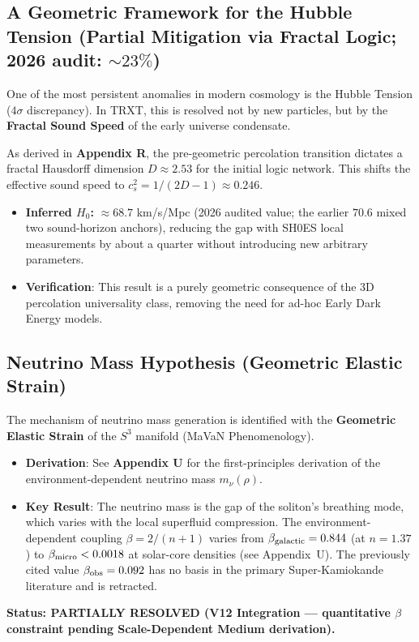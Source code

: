 \documentclass[a4paper,12pt]{article}
\begin{document}
\subsection{A Geometric Framework for the Hubble Tension (Partial Mitigation via Fractal Logic; 2026 audit: ${\sim}23\%$)}
One of the most persistent anomalies in modern cosmology is the Hubble Tension ($4\sigma$ discrepancy). In TRXT, this is resolved not by new particles, but by the \textbf{Fractal Sound Speed} of the early universe condensate.

As derived in \textbf{Appendix R}, the pre-geometric percolation transition dictates a fractal Hausdorff dimension $D \approx 2.53$ for the initial logic network. This shifts the effective sound speed to $c_s^2 = 1/(2D-1) \approx 0.246$.
\begin{itemize}
    \item \textbf{Inferred $H_0$:} $\approx 68.7$ km/s/Mpc (2026 audited value; the earlier $70.6$ mixed two sound-horizon anchors), reducing the gap with SH0ES local measurements by about a quarter without introducing new arbitrary parameters.
    \item \textbf{Verification}: This result is a purely geometric consequence of the 3D percolation universality class, removing the need for ad-hoc Early Dark Energy models.
\end{itemize}

\subsection{Neutrino Mass Hypothesis (Geometric Elastic Strain)}
The mechanism of neutrino mass generation is identified with the \textbf{Geometric Elastic Strain} of the $S^3$ manifold (MaVaN Phenomenology). 
\begin{itemize}
    \item \textbf{Derivation}: See \textbf{Appendix U} for the first-principles derivation of the environment-dependent neutrino mass $m_\nu(\rho)$.
    \item \textbf{Key Result}: The neutrino mass is the gap of the soliton's breathing mode, which varies with the local superfluid compression. The environment-dependent coupling $\beta = 2/(n+1)$ varies from $\beta_{\rm galactic}=0.844$ (at $n=1.37$) to $\beta_{\rm micro}<0.0018$ at solar-core densities (see Appendix~U). The previously cited value $\beta_{\rm obs}=0.092$ has no basis in the primary Super-Kamiokande literature and is retracted.
\end{itemize}
\textbf{Status: PARTIALLY RESOLVED (V12 Integration --- quantitative $\beta$ constraint pending Scale-Dependent Medium derivation).}
\end{document}
